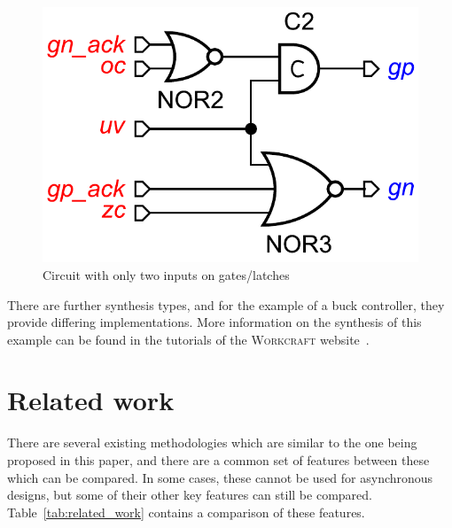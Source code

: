 \documentclass[british,compsoc]{IEEEtran}
\newcommand{\noun}[1]{\textsc{#1}}
\begin{document}
\begin{figure}[h]
\begin{centering}
\includegraphics[scale=0.3]{Images/circuit-buck-deco2-wc}
\par\end{centering}

\protect\caption{\label{fig:circuit-buck-deco2}Circuit with only two inputs on gates/latches}
\end{figure}

There are further synthesis types, and for the example of a buck controller, they provide differing implementations.
More information on the synthesis of this example can be found in the tutorials of the \noun{Workcraft} website~\cite{Workcraft_website}.



\section{Related work\label{sec:related-work}}

There are several existing methodologies which are similar to the
one being proposed in this paper, and there are a common set of features between these which can be compared.
In some cases, these cannot be used for asynchronous designs, but some of their other key features can still be compared.
Table~\ref{tab:related_work} contains a comparison of these features.
\end{document}
